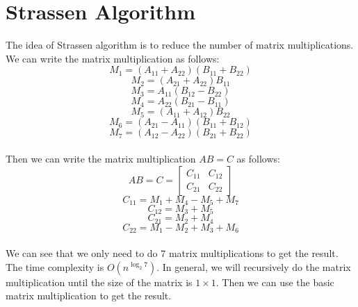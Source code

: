 \documentclass{article}
\begin{document}
\section{Strassen Algorithm}
The idea of Strassen algorithm is to reduce the number of matrix multiplications.
We can write the matrix multiplication as follows:
\begin{equation}
    M_1 = (A_{11} + A_{22})(B_{11} + B_{22})
\end{equation}
\begin{equation}
    M_2 = (A_{21} + A_{22})B_{11}
\end{equation}
\begin{equation}
    M_3 = A_{11}(B_{12} - B_{22})
\end{equation}
\begin{equation}
    M_4 = A_{22}(B_{21} - B_{11})
\end{equation}
\begin{equation}
    M_5 = (A_{11} + A_{12})B_{22}
\end{equation}
\begin{equation}
    M_6 = (A_{21} - A_{11})(B_{11} + B_{12})
\end{equation}
\begin{equation}
    M_7 = (A_{12} - A_{22})(B_{21} + B_{22})
\end{equation}\\
Then we can write the matrix multiplication $AB = C$ as follows:
\begin{equation}
    AB = C = \begin{bmatrix}
        C_{11} & C_{12} \\
        C_{21} & C_{22}
    \end{bmatrix}
\end{equation}
\begin{equation}
    C_{11} = M_1 + M_4 - M_5 + M_7
\end{equation}
\begin{equation}
    C_{12} = M_3 + M_5
\end{equation}
\begin{equation}
    C_{21} = M_2 + M_4
\end{equation}
\begin{equation}
    C_{22} = M_1 - M_2 + M_3 + M_6
\end{equation}\\
We can see that we only need to do $7$ matrix multiplications to get the result. The time complexity is $O(n^{\log_2 7})$.
In general, we will recursively do the matrix multiplication until the size of the matrix is $1 \times 1$.
Then we can use the basic matrix multiplication to get the result.
\end{document}
